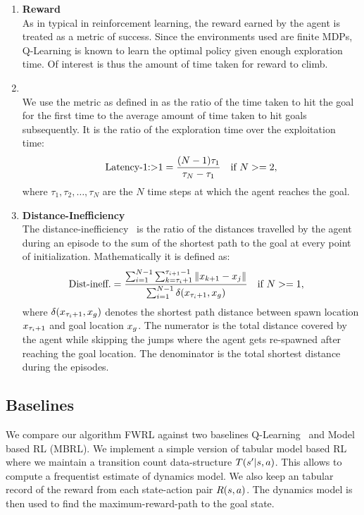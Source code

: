 \begin{enumerate}
    \item \textbf{Reward}\\\noindent
        As in typical in reinforcement learning, the reward earned by
        the agent is treated as a metric of success. Since the
        environments used are finite MDPs, Q-Learning is known to learn
        the optimal policy given enough exploration time. Of interest is
        thus the amount of time taken for reward to climb.

    \item \textbf{\Loo}\\
        We use the metric \Loo as defined in \cite{MiPaViICLR2017} as the ratio
        of the time taken to hit the goal for the first time to the average
        amount of time taken to hit goals subsequently. It
        is the ratio of the exploration time over the exploitation time:
		\begin{align}
			\text{Latency-1:\textgreater1} &= 
			\frac{(N-1) \tau_1}{\tau_{N} - \tau_1} & \text{if }  N >= 2,
		\end{align}%
        where $\tau_1, \tau_2, \dots, \tau_N$ are the $N$ time steps at which
        the agent reaches the goal.


    \item \textbf{Distance-Inefficiency}\\
      The distance-inefficiency~\citep{dhiman2018critical} is the ratio of the
      distances travelled by the agent during an episode to the sum of the shortest
      path to the goal at every point of initialization. Mathematically it is defined
      as:
		\begin{align}
			\text{Dist-ineff.} &=
			\frac{ \sum_{i=1}^{N-1} \sum_{k=\tau_i + 1}^{\tau_{i+1} - 1} \|x_{k+1} - x_{j}\| }
			{ \sum_{i=1}^{N-1} \delta(x_{\tau_i + 1}, x_g) } \quad \text{if } N >= 1,
		\end{align}%
		where $\delta(x_{\tau_i +1}, x_g)$ denotes the shortest path
		distance between spawn location $x_{\tau_i+1}$ and goal location
        $x_g$. The numerator is the total distance covered by the agent while
        skipping the jumps where the agent gets re-spawned after reaching the
        goal location. The denominator is the total shortest distance during the
        episodes.
\end{enumerate}

\subsection{Baselines}
We compare our algorithm FWRL against two baselines
Q-Learning~\cite{watkins1992qlearning} and Model based RL (MBRL).
We implement a simple version of tabular model based RL where we maintain a
transition count data-structure $T(s' | s, a)$.
This allows to compute a frequentist estimate of dynamics model.
We also keep an tabular record of the reward from each state-action pair
$R(s, a)$. The dynamics model is then used to find the
maximum-reward-path to the goal state.

